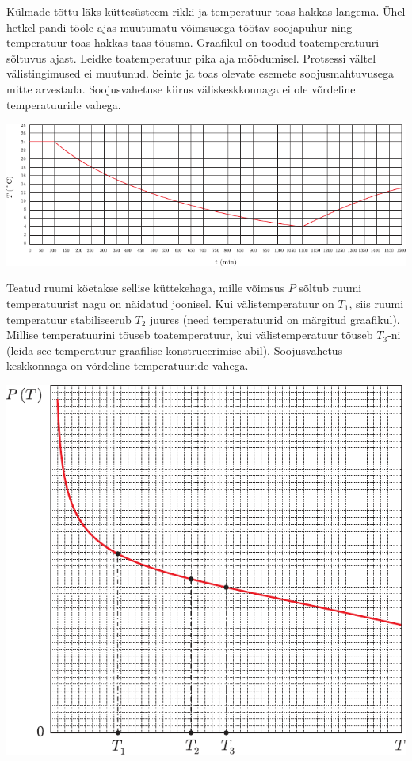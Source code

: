 \documentclass[10pt, twoside]{article}
\begin{document}
{%

Külmade tõttu läks küttesüsteem rikki ja temperatuur toas hakkas langema. Ühel hetkel pandi tööle ajas muutumatu võimsusega töötav soojapuhur ning temperatuur toas hakkas taas tõusma. Graafikul on toodud toatemperatuuri sõltuvus ajast. Leidke toatemperatuur pika aja möödumisel. Protsessi vältel välistingimused ei muutunud. Seinte ja toas olevate esemete soojusmahtuvusega mitte arvestada. Soojusvahetuse kiirus väliskeskkonnaga ei ole võrdeline temperatuuride vahega.

\begin{center}
	\includegraphics[width=\linewidth]{2006-v3g-07-yl}
\end{center}
\probend
\bigskip


Teatud ruumi köetakse sellise küttekehaga, mille võimsus $P$ sõltub ruumi temperatuurist nagu on näidatud joonisel. Kui välistemperatuur on $T_1$, siis ruumi temperatuur stabiliseerub $T_2$ juures (need temperatuurid on märgitud graafikul). Millise temperatuurini tõuseb toatemperatuur, kui välistemperatuur tõuseb $T_3$-ni (leida see temperatuur graafilise konstrueerimise abil). Soojusvahetus keskkonnaga on võrdeline temperatuuride vahega.

\begin{center}
	\includegraphics[width=0.8\linewidth]{2007-v3g-07-yl}
\end{center}
\probend
\bigskip

}
\end{document}
